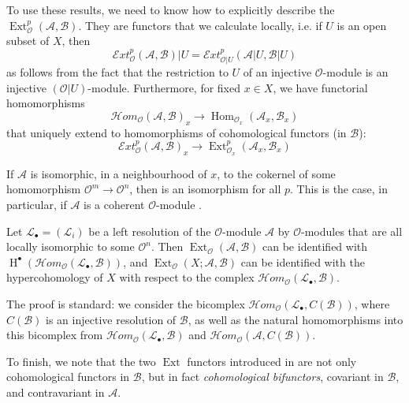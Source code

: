 To use these results, we need to know how to explicitly describe the $\operatorname{Ext}_\mathcal{O}^p(\mathcal{A},\mathcal{B})$.
They are functors that we calculate locally, i.e. if $U$ is an open subset of $X$, then
\[\mathcal{E}xt_\mathcal{O}^p(\mathcal{A},\mathcal{B})|U = \mathcal{E}xt_{\mathcal{O}|U}^p(\mathcal{A}|U,\mathcal{B}|U)\]
as follows from the fact that the restriction to $U$ of an injective $\mathcal{O}$-module is an injective $(\mathcal{O}|U)$-module.
Furthermore, for fixed $x\in X$, we have functorial homomorphisms
\begin{equation}\tag{1.7}\label{fga1-equation-1.7}
    \mathcal{H}om_\mathcal{O}(\mathcal{A},\mathcal{B})_x \to \operatorname{Hom}_{\mathcal{O}_x}(\mathcal{A}_x,\mathcal{B}_x)
\end{equation}
that uniquely extend to homomorphisms of cohomological functors (in $\mathcal{B}$):
\begin{equation}\tag{1.8}\label{fga1-equation-1.8}
    \mathcal{E}xt_\mathcal{O}^p(\mathcal{A},\mathcal{B})_x \to \operatorname{Ext}_{\mathcal{O}_x}^p(\mathcal{A}_x,\mathcal{B}_x)
\end{equation}

\begin{proposition}\label{fga1-proposition-2}
    If $\mathcal{A}$ is isomorphic, in a neighbourhood of $x$, to the cokernel of some homomorphism $\mathcal{O}^m\to\mathcal{O}^n$, then  is an isomorphism for all $p$. This is the case, in particular, if $\mathcal{A}$ is a coherent $\mathcal{O}$-module \cite{Ser1955}.
\end{proposition}

\begin{proposition}\label{fga1-proposition-3}
    Let $\mathcal{L}_\bullet=(\mathcal{L}_i)$ be a left resolution of the $\mathcal{O}$-module $\mathcal{A}$ by $\mathcal{O}$-modules that are all locally isomorphic to some $\mathcal{O}^n$. Then $\operatorname{Ext}_\mathcal{O}(\mathcal{A},\mathcal{B})$ can be identified with $\operatorname{H}^\bullet(\mathcal{H}om_\mathcal{O}(\mathcal{L}_\bullet,\mathcal{B}))$, and $\operatorname{Ext}_\mathcal{O}(X;\mathcal{A},\mathcal{B})$ can be identified with the hypercohomology of $X$ with respect to the complex $\mathcal{H}om_\mathcal{O}(\mathcal{L}_\bullet,\mathcal{B})$.
\end{proposition}

\begin{cproof}
    The proof is standard: we consider the bicomplex $\mathcal{H}om_\mathcal{O}(\mathcal{L}_\bullet,C(\mathcal{B}))$, where $C(\mathcal{B})$ is an injective resolution of $\mathcal{B}$, as well as the natural homomorphisms into this bicomplex from $\mathcal{H}om_\mathcal{O}(\mathcal{L}_\bullet,\mathcal{B})$ and $\mathcal{H}om_\mathcal{O}(\mathcal{A},C(\mathcal{B}))$.
\end{cproof}

To finish, we note that the two $\operatorname{Ext}$ functors introduced in  are not only cohomological functors in $\mathcal{B}$, but in fact \emph{cohomological bifunctors}, covariant in $\mathcal{B}$, and contravariant in $\mathcal{A}$.
